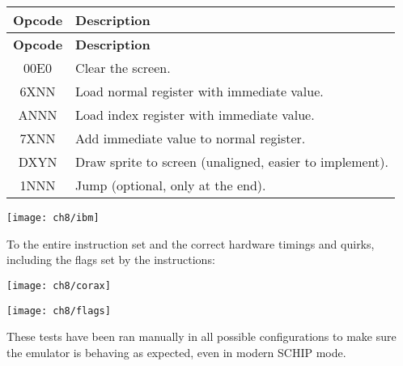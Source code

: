 \begin{longtable}{|c|l|}
\hline
\textbf{Opcode} & \textbf{Description} \\ \hline
\endfirsthead

\hline
\textbf{Opcode} & \textbf{Description} \\ \hline
\endhead

\hline
\endfoot

\hline
\endlastfoot

00E0 & Clear the screen.                                        \\ \hline
6XNN & Load normal register with immediate value.               \\ \hline
ANNN & Load index register with immediate value.                \\ \hline
7XNN & Add immediate value to normal register.                  \\ \hline
DXYN & Draw sprite to screen (unaligned, easier to implement).  \\ \hline
1NNN & Jump (optional, only at the end).                        \\
\end{longtable}

\begin{minipage}{\linewidth}
\texttt{[image: ch8/ibm]}
\centering
{}
\end{minipage}

\clearpage

\par To the entire instruction set and the correct hardware timings and quirks, including the flags set by the instructions:\\

\begin{minipage}{\linewidth}
\texttt{[image: ch8/corax]}
\end{minipage}

\begin{minipage}{\linewidth}
\texttt{[image: ch8/flags]}
\centering
{}
\end{minipage}

\clearpage

\par These tests have been ran manually in all possible configurations to make sure the emulator is behaving as expected, even in modern SCHIP mode.\\

